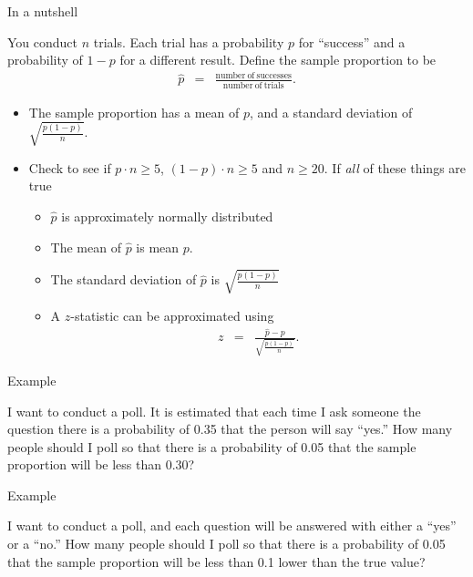 \begin{frame}{In a nutshell}


  You conduct $n$ trials. Each trial has a probability $p$ for
  ``success'' and a probability of $1-p$ for a different
  result. Define the sample proportion to be 
  \begin{eqnarray*}
    \hat{p} & = & \frac{\mathrm{number~of~successes}}{\mathrm{number~of~trials}}.
  \end{eqnarray*}

  \begin{itemize}
  \item The sample proportion has a mean of $p$, and a standard
    deviation of $\sqrt{\frac{p(1-p)}{n}}$.
  \item Check to see if $p\cdot n \geq 5$, $(1-p)\cdot n \geq 5$ and
    $n\geq 20$. If \textit{all} of these things are true
    \begin{itemize}
    \item $\hat{p}$ is approximately normally distributed
    \item The mean of $\hat{p}$ is mean $p$.
    \item The standard deviation of $\hat{p}$ is
      $\sqrt{\frac{p(1-p)}{n}}$
    \item A $z$-statistic can be approximated using
      \begin{eqnarray*}
        z & = & \frac{\hat{p}-p}{\sqrt{\frac{p(1-p)}{n}}}.
      \end{eqnarray*}
    \end{itemize}

  \end{itemize}



  
\end{frame}

\begin{frame}{Example}

  I want to conduct a poll. It is estimated that each time I ask
  someone the question there is a probability of 0.35 that the person
  will say ``yes.'' How many people should I poll so that there is a
  probability of 0.05 that the sample proportion will be less than
  0.30?

  \vfill


\end{frame}

\begin{frame}{Example}

  I want to conduct a poll, and each question will be answered with
  either a ``yes'' or a ``no.''  How many people should I poll so that
  there is a probability of 0.05 that the sample proportion will be
  less than 0.1 lower than the true value?

  \vfill


\end{frame}



